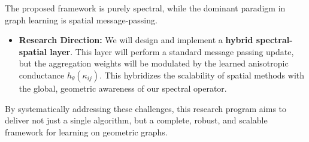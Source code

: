 \documentclass[11pt, letterpaper]{article}
\begin{document}
\begin{description}[style=unboxed, leftmargin=0pt]
    \item[Integration with Spatial GNNs] The proposed framework is purely spectral, while the dominant paradigm in graph learning is spatial message-passing.
    \begin{itemize}
        \item \textbf{Research Direction:} We will design and implement a \textbf{hybrid spectral-spatial layer}. This layer will perform a standard message passing update, but the aggregation weights will be modulated by the learned anisotropic conductance $h_\theta(\kappa_{ij})$. This hybridizes the scalability of spatial methods with the global, geometric awareness of our spectral operator.
    \end{itemize}
\end{description}

By systematically addressing these challenges, this research program aims to deliver not just a single algorithm, but a complete, robust, and scalable framework for learning on geometric graphs.
\end{document}
